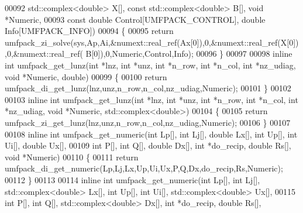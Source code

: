 \begin{DoxyCode}
00092                           std::complex<double> X[], \textcolor{keyword}{const} std::complex<double> B[], \textcolor{keywordtype}{void} *Numeric,
00093                           \textcolor{keyword}{const} \textcolor{keywordtype}{double} Control[UMFPACK\_CONTROL], \textcolor{keywordtype}{double} Info[UMFPACK\_INFO])
00094 \{
00095   \textcolor{keywordflow}{return} umfpack\_zi\_solve(sys,Ap,Ai,&numext::real\_ref(Ax[0]),0,&numext::real\_ref(X[0]),0,&numext::real\_ref(
      B[0]),0,Numeric,Control,Info);
00096 \}
00097 
00098 \textcolor{keyword}{inline} \textcolor{keywordtype}{int} umfpack\_get\_lunz(\textcolor{keywordtype}{int} *lnz, \textcolor{keywordtype}{int} *unz, \textcolor{keywordtype}{int} *n\_row, \textcolor{keywordtype}{int} *n\_col, \textcolor{keywordtype}{int} *nz\_udiag, \textcolor{keywordtype}{void} *Numeric, \textcolor{keywordtype}{
      double})
00099 \{
00100   \textcolor{keywordflow}{return} umfpack\_di\_get\_lunz(lnz,unz,n\_row,n\_col,nz\_udiag,Numeric);
00101 \}
00102 
00103 \textcolor{keyword}{inline} \textcolor{keywordtype}{int} umfpack\_get\_lunz(\textcolor{keywordtype}{int} *lnz, \textcolor{keywordtype}{int} *unz, \textcolor{keywordtype}{int} *n\_row, \textcolor{keywordtype}{int} *n\_col, \textcolor{keywordtype}{int} *nz\_udiag, \textcolor{keywordtype}{void} *Numeric, 
      std::complex<double>)
00104 \{
00105   \textcolor{keywordflow}{return} umfpack\_zi\_get\_lunz(lnz,unz,n\_row,n\_col,nz\_udiag,Numeric);
00106 \}
00107 
00108 \textcolor{keyword}{inline} \textcolor{keywordtype}{int} umfpack\_get\_numeric(\textcolor{keywordtype}{int} Lp[], \textcolor{keywordtype}{int} Lj[], \textcolor{keywordtype}{double} Lx[], \textcolor{keywordtype}{int} Up[], \textcolor{keywordtype}{int} Ui[], \textcolor{keywordtype}{double} Ux[],
00109                                \textcolor{keywordtype}{int} P[], \textcolor{keywordtype}{int} Q[], \textcolor{keywordtype}{double} Dx[], \textcolor{keywordtype}{int} *do\_recip, \textcolor{keywordtype}{double} Rs[], \textcolor{keywordtype}{void} *Numeric)
00110 \{
00111   \textcolor{keywordflow}{return} umfpack\_di\_get\_numeric(Lp,Lj,Lx,Up,Ui,Ux,P,Q,Dx,do\_recip,Rs,Numeric);
00112 \}
00113 
00114 \textcolor{keyword}{inline} \textcolor{keywordtype}{int} umfpack\_get\_numeric(\textcolor{keywordtype}{int} Lp[], \textcolor{keywordtype}{int} Lj[], std::complex<double> Lx[], \textcolor{keywordtype}{int} Up[], \textcolor{keywordtype}{int} Ui[], 
      std::complex<double> Ux[],
00115                                \textcolor{keywordtype}{int} P[], \textcolor{keywordtype}{int} Q[], std::complex<double> Dx[], \textcolor{keywordtype}{int} *do\_recip, \textcolor{keywordtype}{double} Rs[], \textcolor{keywordtype}{
}
\end{DoxyCode}
